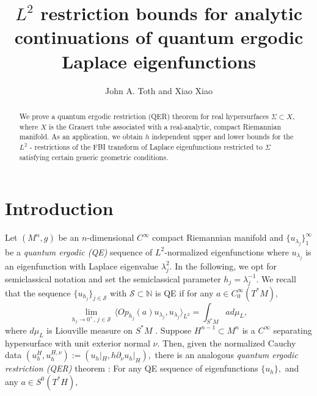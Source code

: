 \documentclass[11pt,reqno]{amsart}
\newcommand{\N}{{\mathbb N}}
\theoremstyle{definition}
\begin{document}
\title[$L^2$ restriction bounds for analytic continuations]{$L^2$ restriction bounds for analytic continuations of quantum ergodic Laplace eigenfunctions}
\author{John A. Toth and Xiao Xiao}
\address{Department of Mathematics and Statistics, McGill University, Montr\'eal, QC, Canada}
\address{Department of Mathematics and Statistics, McGill University, Montr\'eal, QC, Canada}

\begin{abstract}
We prove a quantum ergodic restriction (QER) theorem for real hypersurfaces $\Sigma \subset X,$ where $X$ is the Grauert tube associated with  a real-analytic, compact Riemannian manifold. As an application, we obtain $h$ independent upper and lower bounds for the $L^2$ - restrictions of the FBI transform of Laplace eigenfunctions restricted to $\Sigma$ satisfying certain generic geometric conditions. 
\end{abstract}

\maketitle
\nocite{*}

\section{Introduction}


Let $(M^n,g)$ be an $n$-dimensional $C^{\infty}$ compact Riemannian manifold and $\{ u_{\lambda_j} \}_{1}^{\infty}$ be a {\em quantum ergodic (QE)} sequence of $L^2$-normalized eigenfunctions where $u_{\lambda_j}$ is an eigenfunction with Laplace eigenvalue $\lambda_j^2.$  In the following, we opt for semiclassical notation and set the semiclassical parameter $h_j  = \lambda_j^{-1}.$
We recall that the sequence $\{ u_{h_j} \}_{j \in {\mathcal S}}$  with ${\mathcal S} \subset \N$  is QE if for any $a \in C^{\infty}_0(T^*M),$ 
\begin{equation} \label{QE} 
\lim_{h_j \to 0^+, \, j \in {\mathcal S}} \, \langle Op_{h_j}(a) u_{\lambda_j}, u_{\lambda_j} \rangle_{L^2} = \int_{S^*M} a d\mu_L,
\end{equation}
where $d\mu_L$ is Liouville measure on $S^*M$   \cite{Dya22}. 
 Suppose $H^{n-1} \subset M^n$ is a $C^{\infty}$ separating hypersurface with unit exterior normal $\nu.$ Then, given the normalized Cauchy data $(u_h^H,  u_{h}^{H,\nu}):= (u_h |_H, h \partial_{\nu} u_h |_H),$ there is an analogous {\em quantum ergodic restriction (QER)} theorem \cite{CTZ13}: For any QE sequence of eigenfunctions $\{u_h \},$ and any $a \in S^0(T^*H),$
 
\end{document}

